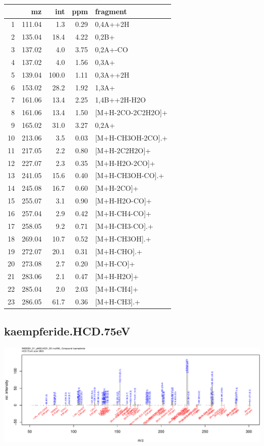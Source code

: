 \documentclass[]{article}
\begin{document}
\begin{table}[ht]
\centering
\begin{tabular}{rrrrl}
  \toprule
 & mz & int & ppm & fragment \\ 
  \midrule
1 & 111.04 & 1.3 & 0.29 & 0,4A++2H \\ 
  2 & 135.04 & 18.4 & 4.22 & 0,2B+ \\ 
  3 & 137.02 & 4.0 & 3.75 & 0,2A+-CO \\ 
  4 & 137.02 & 4.0 & 1.56 & 0,3A+ \\ 
  5 & 139.04 & 100.0 & 1.11 & 0,3A++2H \\ 
  6 & 153.02 & 28.2 & 1.92 & 1,3A+ \\ 
  7 & 161.06 & 13.4 & 2.25 & 1,4B++2H-H2O \\ 
  8 & 161.06 & 13.4 & 1.50 & [M+H-2CO-2C2H2O]+ \\ 
  9 & 165.02 & 31.0 & 3.27 & 0,2A+ \\ 
  10 & 213.06 & 3.5 & 0.03 & [M+H-CH3OH-2CO].+ \\ 
  11 & 217.05 & 2.2 & 0.80 & [M+H-2C2H2O]+ \\ 
  12 & 227.07 & 2.3 & 0.35 & [M+H-H2O-2CO]+ \\ 
  13 & 241.05 & 15.6 & 0.40 & [M+H-CH3OH-CO].+ \\ 
  14 & 245.08 & 16.7 & 0.60 & [M+H-2CO]+ \\ 
  15 & 255.07 & 3.1 & 0.90 & [M+H-H2O-CO]+ \\ 
  16 & 257.04 & 2.9 & 0.42 & [M+H-CH4-CO]+ \\ 
  17 & 258.05 & 9.2 & 0.71 & [M+H-CH3-CO].+ \\ 
  18 & 269.04 & 10.7 & 0.52 & [M+H-CH3OH].+ \\ 
  19 & 272.07 & 20.1 & 0.31 & [M+H-CHO].+ \\ 
  20 & 273.08 & 2.7 & 0.20 & [M+H-CO]+ \\ 
  21 & 283.06 & 2.1 & 0.47 & [M+H-H2O]+ \\ 
  22 & 285.04 & 2.0 & 2.03 & [M+H-CH4]+ \\ 
  23 & 286.05 & 61.7 & 0.36 & [M+H-CH3].+ \\ 
   \bottomrule
\end{tabular}
\end{table}

\clearpage\subsection{kaempferide.HCD.75eV}
\includegraphics[width=\textwidth]{WEB350_files/figure-latex/unnamed-chunk-3-44}
\end{document}
